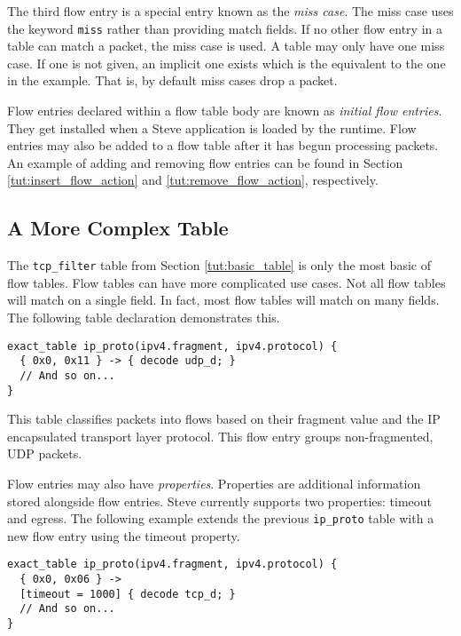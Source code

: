 The third flow entry is a special entry known as the \textit{miss case}. The miss 
case uses the keyword \texttt{miss} rather than providing match fields. If no 
other flow entry in a table can match a packet, the miss case is used. A table 
may only have one miss case. If one is not given, an implicit one exists which 
is the equivalent to the one in the example. That is, by default 
miss cases drop a packet.

Flow entries declared within a flow table body are known
as \textit{initial flow entries}. 
They get installed when a Steve application is loaded by the runtime.
Flow entries may also be added to a flow table after it has begun processing packets. 
An example of adding and removing flow entries can be found in Section \ref{tut:insert_flow_action} and \ref{tut:remove_flow_action}, respectively.

\subsection{A More Complex Table} \label{tut:complex_table}

The \texttt{tcp\_filter} table from Section \ref{tut:basic_table} is only the most basic of flow tables. 
Flow tables can have more complicated use cases.
Not all flow tables will match on a single field. In fact, most flow tables will
match on many fields. The following table declaration demonstrates this.

\begin{codepage}
\begin{lstlisting}
exact_table ip_proto(ipv4.fragment, ipv4.protocol) {
  { 0x0, 0x11 } -> { decode udp_d; }
  // And so on...
}
\end{lstlisting}
\end{codepage}

This table classifies packets into flows based on their fragment value
and the IP encapsulated transport layer protocol. This flow entry
groups non-fragmented, UDP packets.

Flow entries may also have \textit{properties}. Properties are additional
information stored alongside flow entries. 
Steve currently supports two properties: timeout and egress.
The following example extends the previous \texttt{ip\_proto} table with a new flow entry using the timeout property.

\begin{codepage}
\begin{lstlisting}
exact_table ip_proto(ipv4.fragment, ipv4.protocol) {
  { 0x0, 0x06 } ->
  [timeout = 1000] { decode tcp_d; }
  // And so on...
}
\end{lstlisting}
\end{codepage}

